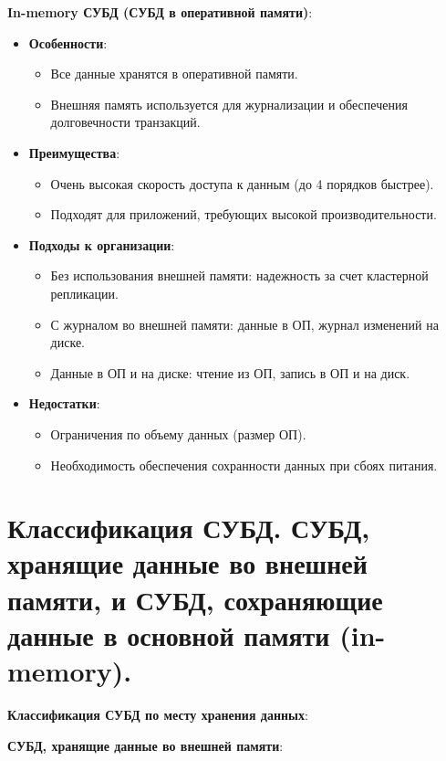 \documentclass[a4paper,12pt]{article}
\begin{document}
\textbf{In-memory СУБД (СУБД в оперативной памяти)}:

\begin{itemize}
    \item \textbf{Особенности}:
    \begin{itemize}
        \item Все данные хранятся в оперативной памяти.
        \item Внешняя память используется для журнализации и обеспечения долговечности транзакций.
    \end{itemize}
    \item \textbf{Преимущества}:
    \begin{itemize}
        \item Очень высокая скорость доступа к данным (до 4 порядков быстрее).
        \item Подходят для приложений, требующих высокой производительности.
    \end{itemize}
    \item \textbf{Подходы к организации}:
    \begin{itemize}
        \item Без использования внешней памяти: надежность за счет кластерной репликации.
        \item С журналом во внешней памяти: данные в ОП, журнал изменений на диске.
        \item Данные в ОП и на диске: чтение из ОП, запись в ОП и на диск.
    \end{itemize}
    \item \textbf{Недостатки}:
    \begin{itemize}
        \item Ограничения по объему данных (размер ОП).
        \item Необходимость обеспечения сохранности данных при сбоях питания.
    \end{itemize}
\end{itemize}


\section{Классификация СУБД. СУБД, хранящие данные во внешней памяти, и СУБД, сохраняющие данные в основной памяти (in-memory).}
\textbf{Классификация СУБД по месту хранения данных}:

\textbf{СУБД, хранящие данные во внешней памяти}:
\end{document}
